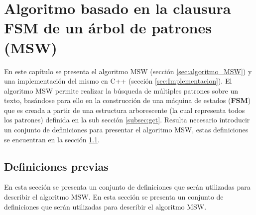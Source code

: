 
\chapter{Algoritmo basado en la clausura FSM de un árbol de patrones (MSW)} %

\label{Chapter3} %

En este capítulo se presenta el algoritmo MSW (sección \ref{sec:algoritmo_MSW}) y una implementación del mismo en C++ (sección \ref{sec:Implementacion}). El algoritmo MSW permite realizar la búsqueda de múltiples patrones sobre un texto, basándose para ello en la construcción de una máquina de estados (\textbf{FSM}) que es creada a partir de una estructura arborescente (la cual representa todos los patrones) definida en la sub sección \ref{subsec:gct}. Resulta necesario introducir un conjunto de definiciones para presentar el algoritmo MSW, estas definiciones se encuentran en la sección \ref{section:def_prev}.
\section{Definiciones previas}
\label{section:def_prev}
En esta sección se presenta un conjunto de definiciones que serán utilizadas para describir el algoritmo MSW.
En esta sección se presenta un conjunto de definiciones que serán utilizadas para describir el algoritmo MSW.
